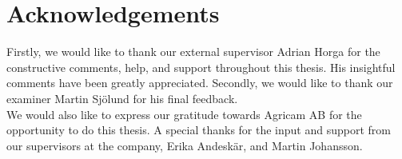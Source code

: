 \chapter*{Acknowledgements}
Firstly, we would like to thank our external supervisor Adrian Horga for the constructive comments, help, and support throughout this thesis. His insightful comments have been greatly appreciated. Secondly, we would like to thank our examiner Martin Sjölund for his final feedback.\\

\noindent We would also like to express our gratitude towards Agricam AB for the opportunity to do this thesis. A special thanks for the input and support from our supervisors at the company, Erika Andeskär, and Martin Johansson.  
